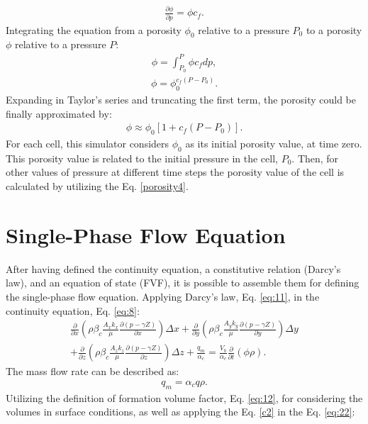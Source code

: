 	\begin{align}
	\label{porosity1}
	\frac{\partial \phi}{\partial p} = \phi c_f.
	\end{align}
Integrating the equation from a porosity $\phi_0$ relative to a pressure $P_0$ to a porosity $\phi$ relative to a pressure $P$:
	\begin{align}
	\label{porosity2}
	\phi= \int_{P_0}^{P}\phi c_f dp,
	\end{align}
	\begin{align}
	\label{porosity3}
	\phi= \phi_0^{c_f(P-P_0)}.
	\end{align}
Expanding in Taylor's series and truncating the first term, the porosity could be finally approximated by:
	\begin{align}
	\label{porosity4}
	\phi\approx \phi_0[1+c_f(P-P_0)].
	\end{align}
For each cell, this simulator considers $\phi_0$ as its initial porosity value, at time zero. This porosity value is related to the initial pressure in the cell, $P_0$. Then, for other values of pressure at different time steps the porosity value of the cell is calculated by utilizing the Eq. \ref{porosity4}.

\section{Single-Phase Flow Equation}

After having defined the continuity equation, a constitutive relation (Darcy's law), and an equation of state (FVF), it is possible to assemble them for defining the single-phase flow equation. Applying Darcy's law, Eq. \ref{eq:11}, in the continuity equation, Eq. \ref{eq:8}:
	\begin{multline}
	\label{eq:22}
	\frac{\partial}{\partial x}\left( \rho \beta_c \frac{A_x k_x}{\mu}\frac{\partial (p - \gamma Z)}{\partial x}\right) \Delta x +
	\frac{\partial}{\partial y}\left( \rho \beta_c \frac{A_y k_y}{\mu}\frac{\partial (p - \gamma Z)}{\partial y}\right) \Delta y \\ +
	\frac{\partial}{\partial z}\left( \rho \beta_c \frac{A_z k_z}{\mu}\frac{\partial (p - \gamma Z)}{\partial z}\right) \Delta z +
	\frac{q_m}{\alpha_c}= \frac {V_b}{\alpha_c}\frac{\partial}{\partial t}\left( \phi \rho\right) .
	\end{multline}
The mass flow rate can be described as:
	\begin{align}
	\label{c2}
	q_m=\alpha_c q \rho.
	\end{align}
Utilizing the definition of formation volume factor, Eq. \ref{eq:12}, for considering the volumes in surface conditions, as well as applying the Eq. \ref{c2} in the Eq. \ref{eq:22}:

